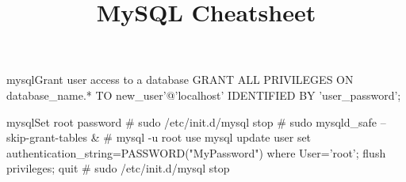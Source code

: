 \documentclass[10pt,a4paper]{article}
\title{\color{w3schools}MySQL Cheatsheet
}
\begin{document}
\maketitle
\small
\begin{multicols}{3}

\thispagestyle{empty}
\scriptsize

% 




\begin{codebox}{mysql}{Grant user access to a database}
GRANT ALL PRIVILEGES ON database_name.* TO new_user'@'localhost' IDENTIFIED BY 'user_password';

\end{codebox}

\begin{codebox}{mysql}{Set root password}
# sudo /etc/init.d/mysql stop
# sudo mysqld_safe --skip-grant-tables &
# mysql -u root
  use mysql
  update user set authentication_string=PASSWORD("MyPassword") where User='root';
  flush privileges;
  quit
# sudo /etc/init.d/mysql stop

\end{codebox}


\AtNextBibliography{\footnotesize}
\printbibliography  
\end{multicols}
\end{document}
